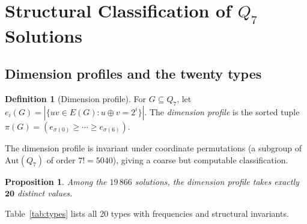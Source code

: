 \documentclass[12pt,a4paper]{article}
\newtheorem{proposition}[theorem]{Proposition}
\theoremstyle{definition}
\newtheorem{definition}[theorem]{Definition}
\begin{document}
\section{Structural Classification of $Q_7$ Solutions}\label{sec:structure}

\subsection{Dimension profiles and the twenty types}

\begin{definition}[Dimension profile]
For $G\subseteq Q_7$, let $e_i(G)=|\{uv\in E(G):u\oplus v=2^i\}|$.
The \emph{dimension profile} is the sorted tuple
$\pi(G)=(e_{\sigma(0)}\ge\cdots\ge e_{\sigma(6)})$.
\end{definition}

The dimension profile is invariant under coordinate permutations (a subgroup
of $\mathrm{Aut}(Q_7)$ of order $7!=5040$), giving a coarse but computable
classification.

\begin{proposition}\label{prop:twenty}
Among the $19\,866$ solutions, the dimension profile takes exactly
$\mathbf{20}$ distinct values.
\end{proposition}

Table~\ref{tab:types} lists all 20 types with frequencies and structural invariants.
\end{document}
